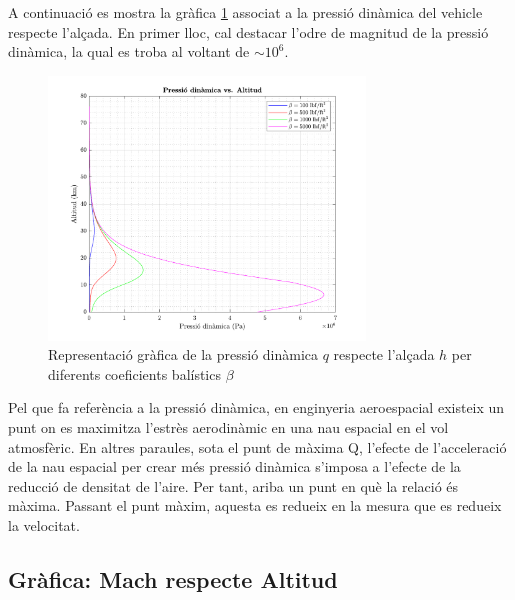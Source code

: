 A continuació es mostra la gràfica \ref{fig:pressio_dinamica} associat a la pressió dinàmica del vehicle respecte l'alçada. En primer lloc, cal destacar l'odre de magnitud de la pressió dinàmica, la qual es troba al voltant de $\sim 10^6$. 

\begin{figure}[ht]
    \centering
    \includegraphics[width=0.75\textwidth]{imagenes/01_ballistic_graficas/pressio_dinamica.pdf}
    \caption{Representació gràfica de la pressió dinàmica $q$ respecte l'alçada $h$ per diferents coeficients balístics $\beta$}
    \label{fig:pressio_dinamica}
\end{figure}

Pel que fa referència a la pressió dinàmica, en enginyeria aeroespacial existeix un punt on es maximitza l'estrès aerodinàmic en una nau espacial en el vol atmosfèric. En altres paraules, sota el punt de màxima Q, l'efecte de l'acceleració de la nau espacial per crear més pressió dinàmica s'imposa a l'efecte de la reducció de densitat de l'aire. Per tant, ariba un punt en què la relació és màxima. Passant el punt màxim, aquesta es redueix en la mesura que es redueix la velocitat.

\newpage
\subsection{Gràfica: Mach respecte Altitud}

